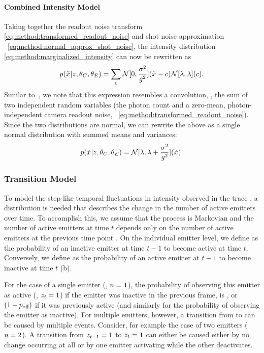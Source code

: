 \paragraph{Combined Intensity Model}

Taking together the readout noise transform
\eqref{eq:method:transformed_readout_noise} and shot noise approximation ~\eqref{eq:method:normal_approx_shot_noise}, the
intensity distribution \eqref{eq:method:marginalized_intensity} can now be
rewritten as
%
  \begin{equation}
    p(\tilde{x}_{}|z_{},\theta_C, \theta_E)
      = \sum_c
        \mathcal{N}[0, \frac{\sigma^2}{g^2}](\tilde{x}_{} - c)
        \mathcal{N}[\lambda, \lambda](c)
    \text{.}
  \end{equation}
  Similar to~\cite{huang_video-rate_2013}, we note that this expression
  resembles a convolution, \ie, the sum of two independent random variables
  (the photon count \photons and a zero-mean, photon-independent camera readout
  noise, ~\eqref{eq:method:transformed_readout_noise}). Since the two distributions are normal, we can rewrite
  the above as a single normal distribution with summed means and variances:
  \begin{equation}
    p(\tilde{x}_{}|z_{},\theta_C, \theta_E)
      = \mathcal{N}[\lambda, \lambda + \frac{\sigma^2}{g^2}](\tilde{x}_{})
    \text{.}
    \label{eq:method:combined_intensity}
  \end{equation}

\subsubsection{Transition Model}

To model the step-like temporal fluctuations in intensity observed in
the trace \trace, a distribution is needed that describes the change in the
number of active emitters \z{} over time.
  To accomplish this, we assume that the process is Markovian and the number of active
  emitters  at time $t$ depends only on the number of active emitters at
  the previous time point .
  On the individual emitter level, we define \pon as the probability of an
  inactive emitter at time $t-1$ to become active at time $t$.
  Conversely, we define \poff as the probability of an active emitter at $t-1$
  to become inactive at time $t$ (b).

For the case of a single emitter (\ie, $n=1$), the probability of observing
this emitter as active (\ie, $z_{t}=1$) if the emitter was
inactive in the previous frame, is \pon , or $(1-p_\text{off})$ if 
it was previously active (and similarly for the probability of observing 
the emitter as inactive).
  For multiple emitters, however, a transition from  to  can be
  caused by multiple events. Consider, for example the case of two emitters
  ($n=2$). A transition from $z_{t-1}=1$ to $z_{t}=1$ can either be caused either by
  no change occurring at all or by one emitter activating while the other
  deactivates.


